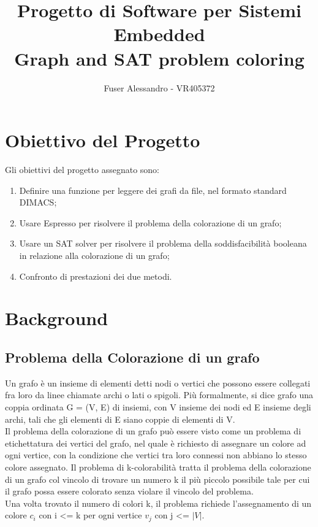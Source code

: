 \documentclass[a4paper,11pt]{article} %
\begin{document}
\author{Fuser Alessandro - VR405372}
\title{Progetto di Software per Sistemi Embedded \\ Graph and SAT problem coloring}
\maketitle

\tableofcontents

\newpage

\section{Obiettivo del Progetto}
Gli obiettivi del progetto assegnato sono:
\begin{enumerate}
	\item Definire una funzione per leggere dei grafi da file, nel formato standard DIMACS;
	\item Usare Espresso per risolvere il problema della colorazione di un grafo;
	\item Usare un SAT solver per risolvere il problema della soddisfacibilità booleana in relazione alla colorazione di un grafo;
	\item Confronto di prestazioni dei due metodi.
\end{enumerate}

\section{Background}
\subsection{Problema della Colorazione di un grafo}
Un grafo è un insieme di elementi detti nodi o vertici che possono essere collegati fra loro da linee chiamate archi o lati o spigoli. Più formalmente, si dice grafo una coppia ordinata G = (V, E) di insiemi, con V insieme dei nodi ed E insieme degli archi, tali che gli elementi di E siano coppie di elementi di V. \\
Il problema della colorazione di un grafo può essere visto come un problema di etichettatura dei vertici del grafo, nel quale è richiesto di assegnare un colore ad ogni vertice, con la condizione che vertici tra loro connessi non abbiano lo stesso colore assegnato. Il problema di k-colorabilità tratta il problema della colorazione di un grafo col vincolo di trovare un numero k il più piccolo possibile tale per cui il grafo possa essere colorato senza violare il vincolo del problema. \\
Una volta trovato il numero di colori k, il problema richiede l'assegnamento di un colore $c_{i}$ con i <= k per ogni vertice $v_{j}$ con j <= $|V|$.\\
\end{document}
